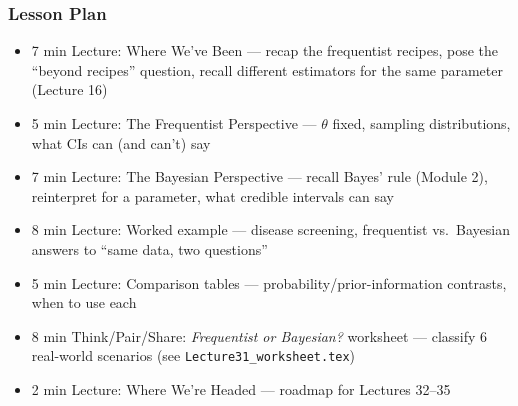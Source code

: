\begin{frame}
    \frametitle{Lesson Plan}
    \begin{itemize}
        \item 7 min Lecture: Where We've Been --- recap the frequentist recipes, pose the ``beyond recipes'' question, recall different estimators for the same parameter (Lecture 16)
        \item 5 min Lecture: The Frequentist Perspective --- $\theta$ fixed, sampling distributions, what CIs can (and can't) say
        \item 7 min Lecture: The Bayesian Perspective --- recall Bayes' rule (Module 2), reinterpret for a parameter, what credible intervals can say
        \item 8 min Lecture: Worked example --- disease screening, frequentist vs.\ Bayesian answers to ``same data, two questions''
        \item 5 min Lecture: Comparison tables --- probability/prior-information contrasts, when to use each
        \item 8 min Think/Pair/Share: \textit{Frequentist or Bayesian?} worksheet --- classify 6 real-world scenarios (see \texttt{Lecture31\_worksheet.tex})
        \item 2 min Lecture: Where We're Headed --- roadmap for Lectures 32--35
    \end{itemize}
\end{frame}


